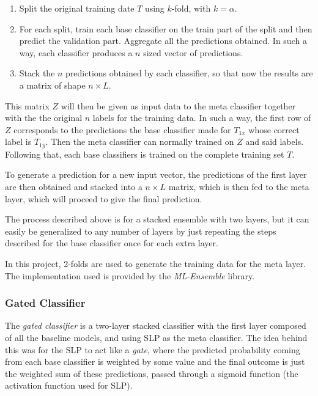 \documentclass[epsfig,a4paper,11pt,titlepage,twoside,openany]{book}
\begin{document}
\begin{enumerate}
    \item Split the original training date $T$ using $k$-fold, with $k = \alpha$.
    \item For each split, train each base classifier on the train part of the split and then predict the validation part. Aggregate all the predictions obtained. In such a way, each classifier produces a $n$ sized vector of predictions.
    \item Stack the $n$ predictions obtained by each classifier, so that now the results are a matrix of shape $n \times L$.
\end{enumerate}

This matrix $Z$ will then be given as input data to the meta classifier together with the the original $n$ labels for the training data. In such a way, the first row of $Z$ corresponds to the predictions the base classifier made for $T_{1x}$ whose correct label is $T_{1y}$. Then the meta classifier can normally trained on $Z$ and said labels. Following that, each base classifiers is trained on the complete training set $T$.

To generate a prediction for a new input vector, the predictions of the first layer are then obtained and stacked into a $n \times L$ matrix, which is then fed to the meta layer, which will proceed to give the final prediction. 

The process described above is for a stacked ensemble with two layers, but it can easily be generalized to any number of layers by just repeating the steps described for the base classifier once for each extra layer. 

In this project, 2-folds are used to generate the training data for the meta layer. The implementation used is provided by the \textit{ML-Ensemble} \cite{flennerhag:2017mlens} library.



\subsubsection{Gated Classifier}
\label{sec:gated-classifier}

The \textit{gated classifier} is a two-layer stacked classifier with the first layer composed of all the baseline models, and using SLP as the meta classifier. The idea behind this was for the SLP to act like a \textit{gate}, where the predicted probability coming from each base classifier is weighted by some value and the final outcome is just the weighted sum of these predictions, passed through a sigmoid function (the activation function used for SLP). 
\end{document}
